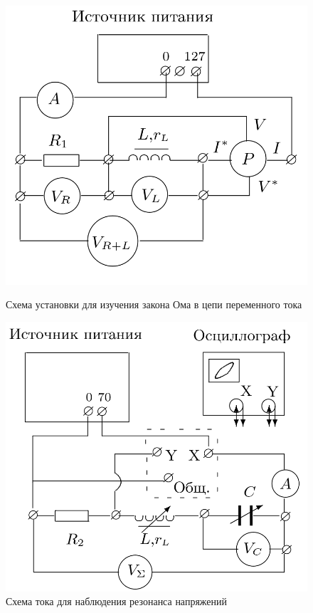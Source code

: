 \documentclass[a4paper,12pt]{article} %
\begin{document}
\begin{figure}[h]
\begin{center}
\begin{minipage}[h]{0.49\textwidth}
\includegraphics[width=\textwidth]{setup1.png}
\caption{Схема установки для изучения закона Ома в цепи переменного тока}
\label{setup1}
\hfill
\end{minipage}
\begin{minipage}[h]{0.49\textwidth}
\includegraphics[width=\textwidth]{setup2.png}
\caption{Схема тока для наблюдения резонанса напряжений}
\label{setup2}
\hfill
\end{minipage}
\end{center}
\end{figure}
\end{document}
